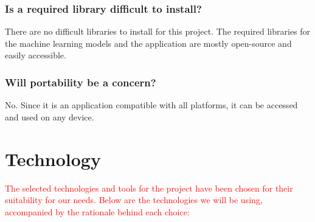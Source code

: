 \documentclass{article}
\begin{document}
\subsubsection{Is a required library difficult to install?}

There are no difficult libraries to install for this project. The required
libraries for the machine learning models and the application are mostly
open-source and easily accessible.

\subsubsection{Will portability be a concern?}

No. Since it is an application compatible with all platforms, it can be accessed
and used on any device.

\section{Technology}

\textcolor{red}{The selected technologies and tools for the project have been chosen 
for their suitability for our needs. Below are the technologies we will be using, 
accompanied by the rationale behind each choice:}
\end{document}
